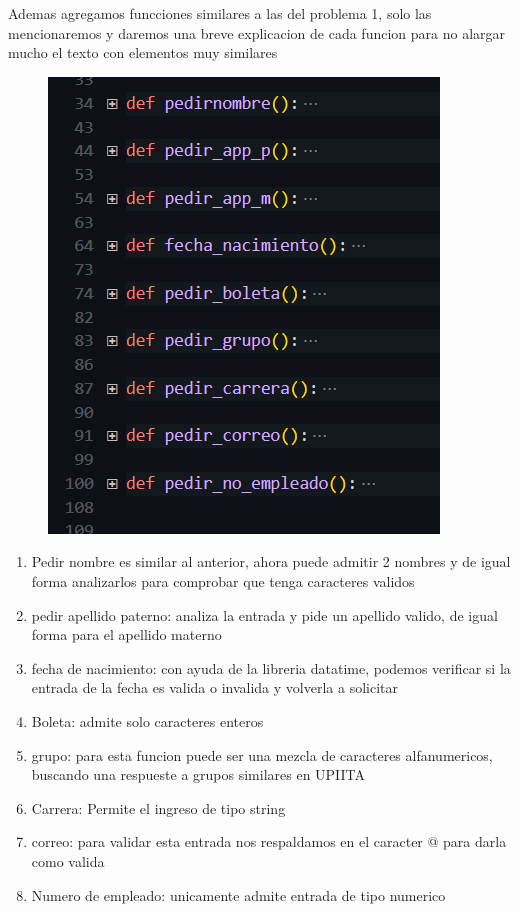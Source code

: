 \documentclass[12pt]{article}
\begin{document}
Ademas agregamos funcciones similares a las del problema 1, solo las mencionaremos y daremos una breve explicacion de cada funcion para no alargar mucho el texto con elementos muy similares
\begin{figure}[H]
		\begin{center}
 			\includegraphics[width = .4\textwidth]{11.png}
 			
		\end{center} 
\end{figure}

\begin{enumerate}
\item Pedir nombre es similar al anterior, ahora puede admitir 2 nombres y de igual forma analizarlos para comprobar que tenga caracteres validos
\item pedir apellido paterno: analiza la entrada y pide un apellido valido, de igual forma para el apellido materno
\item fecha de nacimiento: con ayuda de la libreria datatime, podemos verificar si la entrada de la fecha es valida o invalida y volverla a solicitar
\item Boleta: admite solo caracteres enteros
\item grupo: para esta funcion puede ser una mezcla de caracteres alfanumericos, buscando una respueste a grupos similares en UPIITA
\item Carrera: Permite el ingreso de tipo string
\item correo: para validar esta entrada nos respaldamos en el caracter @ para darla como valida
\item Numero de empleado: unicamente admite entrada de tipo numerico
\end{enumerate}
\end{document}
